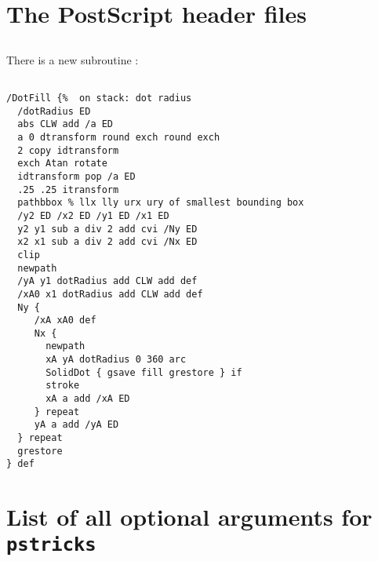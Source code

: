 \documentclass[11pt,english,BCOR10mm,DIV12,bibliography=totoc,parskip=false,smallheadings
    headexclude,footexclude,oneside]{pst-doc}
\begin{document}
\section{The PostScript header files}
\subsection{}
There is a new subroutine :
\begin{lstlisting}

/DotFill {%	 on stack: dot radius
  /dotRadius ED
  abs CLW add /a ED 
  a 0 dtransform round exch round exch
  2 copy idtransform 
  exch Atan rotate 
  idtransform pop /a ED 
  .25 .25 itransform 
  pathbbox % llx lly urx ury of smallest bounding box
  /y2 ED /x2 ED /y1 ED /x1 ED 
  y2 y1 sub a div 2 add cvi /Ny ED
  x2 x1 sub a div 2 add cvi /Nx ED
  clip 
  newpath 
  /yA y1 dotRadius add CLW add def
  /xA0 x1 dotRadius add CLW add def
  Ny {
     /xA xA0 def
     Nx { 
       newpath 
       xA yA dotRadius 0 360 arc 
       SolidDot { gsave fill grestore } if 
       stroke
       xA a add /xA ED
     } repeat
     yA a add /yA ED
  } repeat
  grestore
} def
\end{lstlisting}




\section{List of all optional arguments for \texttt{pstricks}}

\makeatletter
{}
\makeatother
\end{document}
